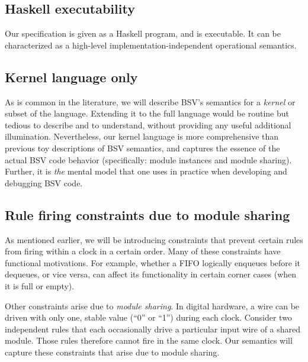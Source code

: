 \documentclass[11pt]{article}
\begin{document}

\subsection{Haskell executability}

Our specification is given as a Haskell program, and is executable.
It can be characterized as a high-level implementation-independent
operational semantics.


\subsection{Kernel language only}

As is common in the literature, we will describe BSV's semantics for a
\emph{kernel} or subset of the language.  Extending it to the full
language would be routine but tedious to describe and to understand,
without providing any useful additional illumination.  Nevertheless,
our kernel language is more comprehensive than previous toy
descriptions of BSV semantics, and captures the essence of the actual
BSV code behavior (specifically: module instances and module sharing).
Further, it is \emph{the} mental model that one uses in practice when
developing and debugging BSV code.


\subsection{Rule firing constraints due to module sharing}

As mentioned earlier, we will be introducing constraints that prevent
certain rules from firing within a clock in a certain order.  Many of
these constraints have functional motivations.  For example, whether a
FIFO logically enqueues before it dequeues, or vice versa, can affect
its functionality in certain corner cases (when it is full or empty).

Other constraints arise due to \emph{module sharing}.  In digital
hardware, a wire can be driven with only one, stable value (``0'' or
``1'') during each clock.  Consider two independent rules that each
occasionally drive a particular input wire of a shared module.  Those
rules therefore cannot fire in the same clock.  Our semantics will
capture these constraints that arise due to module sharing.
\end{document}
